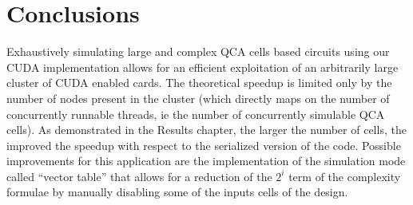 \chapter{Conclusions}\label{sec:conclusions}
Exhaustively simulating large and complex QCA cells based circuits using our CUDA implementation allows for an efficient exploitation of an arbitrarily large cluster of CUDA enabled cards. The theoretical speedup is limited only by the number of nodes present in the cluster (which directly maps on the number of concurrently runnable threads, ie the number of concurrently simulable QCA cells). As demonstrated in the Results chapter, the larger the number of cells, the improved the speedup with respect to the serialized version of the code.
Possible improvements for this application are the implementation of the simulation mode called ``vector table'' that allows for a reduction of the $2^i$ term of the complexity formulae by manually disabling some of the inputs cells of the design.
